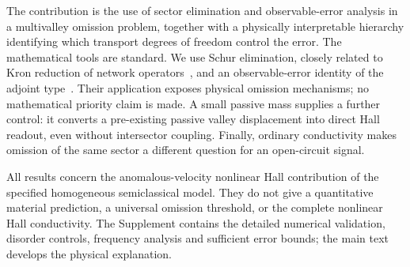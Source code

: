 The contribution is the use of sector elimination and observable-error analysis in a multivalley omission problem, together with a physically interpretable hierarchy identifying which transport degrees of freedom control the error. The mathematical tools are standard. We use Schur elimination, closely related to Kron reduction of network operators~\cite{DorflerBullo2013}, and an observable-error identity of the adjoint type~\cite{PierceGiles2004}. Their application exposes physical omission mechanisms; no mathematical priority claim is made. A small passive mass supplies a further control: it converts a pre-existing passive valley displacement into direct Hall readout, even without intersector coupling. Finally, ordinary conductivity makes omission of the same sector a different question for an open-circuit signal.

All results concern the anomalous-velocity nonlinear Hall contribution of the specified homogeneous semiclassical model. They do not give a quantitative material prediction, a universal omission threshold, or the complete nonlinear Hall conductivity. The Supplement contains the detailed numerical validation, disorder controls, frequency analysis and sufficient error bounds; the main text develops the physical explanation.
